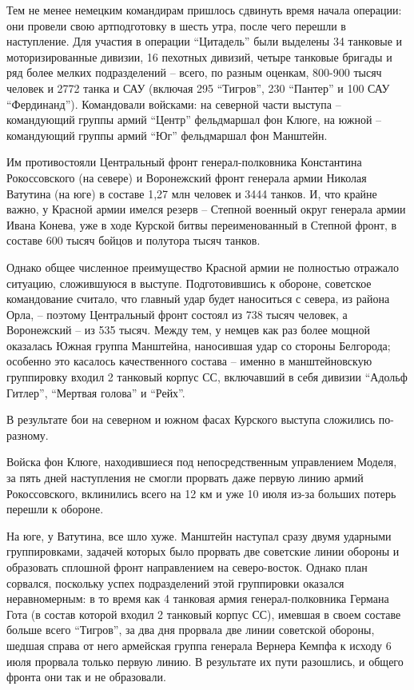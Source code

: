 Тем не менее немецким командирам пришлось сдвинуть время начала операции: они
провели свою артподготовку в шесть утра, после чего перешли в наступление. Для
участия в операции \enquote{Цитадель} были выделены 34 танковые и моторизированные
дивизии, 16 пехотных дивизий, четыре танковые бригады и ряд более мелких
подразделений – всего, по разным оценкам, 800-900 тысяч человек и 2772 танка и
САУ (включая 295 \enquote{Тигров}, 230 \enquote{Пантер} и 100 САУ \enquote{Фердинанд}). Командовали
войсками: на северной части выступа – командующий группы армий \enquote{Центр}
фельдмаршал фон Клюге, на южной – командующий группы армий \enquote{Юг} фельдмаршал фон
Манштейн.


Им противостояли Центральный фронт генерал-полковника Константина Рокоссовского
(на севере) и Воронежский фронт генерала армии Николая Ватутина (на юге) в
составе 1,27 млн человек и 3444 танков. И, что крайне важно, у Красной армии
имелся резерв – Степной военный округ генерала армии Ивана Конева, уже в ходе
Курской битвы переименованный в Степной фронт, в составе 600 тысяч бойцов и
полутора тысяч танков.

Однако общее численное преимущество Красной армии не полностью отражало
ситуацию, сложившуюся в выступе. Подготовившись к обороне, советское
командование считало, что главный удар будет наноситься с севера, из района
Орла, – поэтому Центральный фронт состоял из 738 тысяч человек, а Воронежский –
из 535 тысяч. Между тем, у немцев как раз более мощной оказалась Южная группа
Манштейна, наносившая удар со стороны Белгорода; особенно это касалось
качественного состава – именно в манштейновскую группировку входил 2 танковый
корпус СС, включавший в себя дивизии \enquote{Адольф Гитлер}, \enquote{Мертвая голова} и
\enquote{Рейх}.

В результате бои на северном и южном фасах Курского выступа сложились
по-разному.

Войска фон Клюге, находившиеся под непосредственным управлением Моделя, за пять
дней наступления не смогли прорвать даже первую линию армий Рокоссовского,
вклинились всего на 12 км и уже 10 июля из-за больших потерь перешли к обороне.

На юге, у Ватутина, все шло хуже. Манштейн наступал сразу двумя ударными
группировками, задачей которых было прорвать две советские линии обороны и
образовать сплошной фронт направлением на северо-восток. Однако план сорвался,
поскольку успех подразделений этой группировки оказался неравномерным: в то
время как 4 танковая армия генерал-полковника Германа Гота (в состав которой
входил 2 танковый корпус СС), имевшая в своем составе больше всего \enquote{Тигров}, за
два дня прорвала две линии советской обороны, шедшая справа от него армейская
группа генерала Вернера Кемпфа к исходу 6 июля прорвала только первую линию. В
результате их пути разошлись, и общего фронта они так и не образовали.


